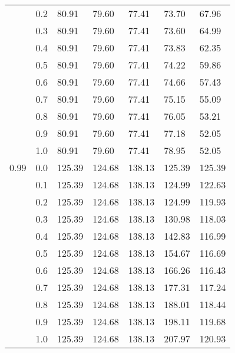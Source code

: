 \begin{longtable}{lp{2cm}|p{2cm}p{2cm}p{2cm}p{2cm}p{2cm}}
     & 0.2 &       80.91 &             79.60 &                77.41 &                73.70 &           67.96 \\
     & 0.3 &       80.91 &             79.60 &                77.41 &                73.60 &           64.99 \\
     & 0.4 &       80.91 &             79.60 &                77.41 &                73.83 &           62.35 \\
     & 0.5 &       80.91 &             79.60 &                77.41 &                74.22 &           59.86 \\
     & 0.6 &       80.91 &             79.60 &                77.41 &                74.66 &           57.43 \\
     & 0.7 &       80.91 &             79.60 &                77.41 &                75.15 &           55.09 \\
     & 0.8 &       80.91 &             79.60 &                77.41 &                76.05 &           53.21 \\
     & 0.9 &       80.91 &             79.60 &                77.41 &                77.18 &           52.05 \\
     & 1.0 &       80.91 &             79.60 &                77.41 &                78.95 &           52.05 \\
0.99 & 0.0 &      125.39 &            124.68 &               138.13 &               125.39 &          125.39 \\
     & 0.1 &      125.39 &            124.68 &               138.13 &               124.99 &          122.63 \\
     & 0.2 &      125.39 &            124.68 &               138.13 &               124.99 &          119.93 \\
     & 0.3 &      125.39 &            124.68 &               138.13 &               130.98 &          118.03 \\
     & 0.4 &      125.39 &            124.68 &               138.13 &               142.83 &          116.99 \\
     & 0.5 &      125.39 &            124.68 &               138.13 &               154.67 &          116.69 \\
     & 0.6 &      125.39 &            124.68 &               138.13 &               166.26 &          116.43 \\
     & 0.7 &      125.39 &            124.68 &               138.13 &               177.31 &          117.24 \\
     & 0.8 &      125.39 &            124.68 &               138.13 &               188.01 &          118.44 \\
     & 0.9 &      125.39 &            124.68 &               138.13 &               198.11 &          119.68 \\
     & 1.0 &      125.39 &            124.68 &               138.13 &               207.97 &          120.93 \\
\end{longtable}
